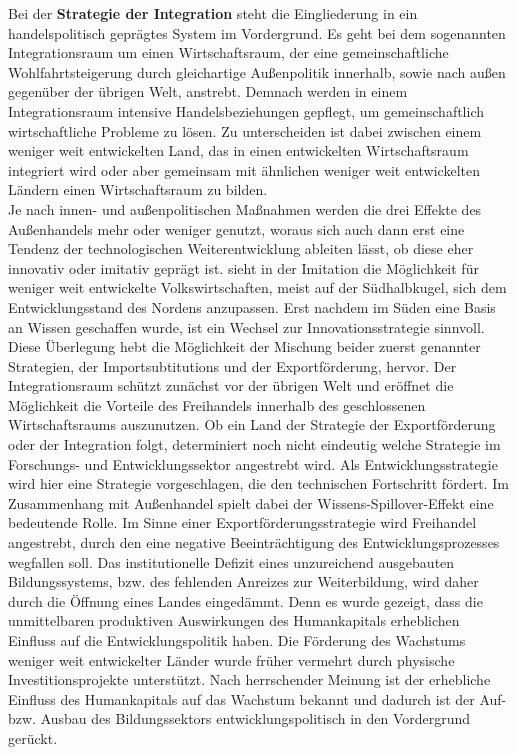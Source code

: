 %
Bei der \textbf{Strategie der Integration} steht die Eingliederung in ein handelspolitisch geprägtes System im Vordergrund. Es geht bei dem sogenannten Integrationsraum um einen Wirtschaftsraum, der eine gemeinschaftliche Wohlfahrtsteigerung durch gleichartige Außenpolitik innerhalb, sowie nach außen gegenüber der übrigen Welt, anstrebt. Demnach werden in einem Integrationsraum intensive Handelsbeziehungen gepflegt, um gemeinschaftlich wirtschaftliche Probleme zu lösen. Zu unterscheiden ist dabei zwischen einem weniger weit entwickelten Land, das in einen entwickelten Wirtschaftsraum integriert wird oder aber gemeinsam mit ähnlichen weniger weit entwickelten Ländern einen Wirtschaftsraum zu bilden.\\
%
Je nach innen- und außenpolitischen Maßnahmen werden die drei Effekte des Außenhandels mehr oder weniger genutzt, woraus sich auch dann erst eine Tendenz der technologischen Weiterentwicklung ableiten lässt, ob diese eher innovativ oder imitativ geprägt ist. 
\cite{Glass.1999} sieht in der Imitation die Möglichkeit für weniger weit entwickelte Volkswirtschaften, meist auf der Südhalbkugel, sich dem Entwicklungsstand des Nordens anzupassen. Erst nachdem im Süden eine Basis an Wissen geschaffen wurde, ist ein Wechsel zur Innovationsstrategie sinnvoll. \\
%
Diese Überlegung hebt die Möglichkeit der Mischung beider zuerst genannter Strategien, der Importsubtitutions und der Exportförderung, hervor. Der Integrationsraum schützt zunächst vor der übrigen Welt und eröffnet die Möglichkeit die Vorteile des Freihandels innerhalb des geschlossenen Wirtschaftsraums auszunutzen. Ob ein Land der Strategie der Exportförderung oder der Integration folgt, determiniert noch nicht eindeutig welche Strategie im Forschungs- und Entwicklungssektor angestrebt wird.
\bigskip
%
Als Entwicklungsstrategie wird hier eine Strategie vorgeschlagen, die den technischen Fortschritt fördert. Im Zusammenhang mit Außenhandel spielt dabei der Wissens-Spillover-Effekt eine bedeutende Rolle. Im Sinne einer Exportförderungsstrategie wird Freihandel angestrebt, durch den eine negative Beeinträchtigung des Entwicklungsprozesses wegfallen soll. Das institutionelle Defizit eines unzureichend ausgebauten Bildungssystems, bzw. des fehlenden Anreizes zur Weiterbildung, wird daher durch die Öffnung eines Landes eingedämmt. Denn es wurde gezeigt, dass die unmittelbaren produktiven Auswirkungen des Humankapitals erheblichen Einfluss auf die Entwicklungspolitik haben. Die Förderung des Wachstums weniger weit entwickelter Länder wurde früher vermehrt durch physische Investitionsprojekte unterstützt. Nach herrschender Meinung ist der erhebliche Einfluss des Humankapitals auf das Wachstum bekannt und dadurch ist der Auf- bzw. Ausbau des Bildungssektors entwicklungspolitisch in den Vordergrund gerückt.\\
